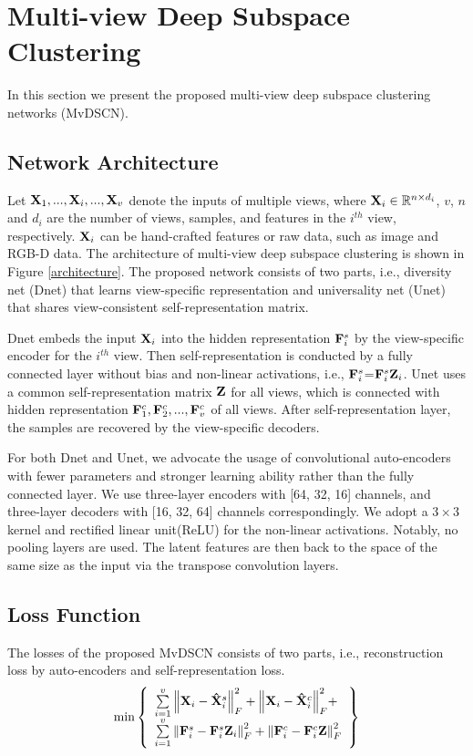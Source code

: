 \documentclass[journal]{IEEEtran}
\begin{document}
\section{Multi-view Deep Subspace Clustering}
\label{s3}

In this section we present the proposed multi-view deep subspace clustering networks (MvDSCN).
\subsection{Network Architecture}
Let ${\bf{X}}_1,..., {\bf{X}}_i,...,{\bf{X}}_v$ denote the inputs of multiple views, where ${\bf{X}}_i \in \mathbb{R}^{n \times d_i}$, $v$, $n$ and $d_i$ are the number of views, samples, and features in the $i^{th}$ view, respectively.
$ {\bf{X}}_i$ can be hand-crafted features or raw data, such as image and RGB-D data.
The architecture of multi-view deep subspace clustering is shown in Figure \ref{architecture}.
The proposed network consists of two parts, i.e., diversity net (Dnet) that learns view-specific representation and universality net (Unet) that shares view-consistent self-representation matrix.

Dnet embeds the input ${\bf{X}}_i$ into the hidden representation ${\bf{F}}^s_i$ by the view-specific encoder for the $i^{th}$ view.
Then self-representation is conducted by a fully connected layer without bias and non-linear activations, i.e., ${\bf{F}}^s_i$=${\bf{F}}^s_i {\bf{Z}}_i$.
Unet uses a common self-representation matrix $\bf{Z}$ for all views, which is connected with hidden representation ${\bf{F}}^c_1, {\bf{F}}^c_2,..., {\bf{F}}^c_v$ of all views.
After self-representation layer, the samples are recovered by the view-specific decoders.

For both Dnet and Unet, we advocate the usage of convolutional auto-encoders with fewer parameters and stronger learning ability rather than the fully connected layer.
We use three-layer encoders with [64, 32, 16] channels, and three-layer decoders with [16, 32, 64] channels correspondingly.
We adopt a $3 \times 3$ kernel and rectified linear unit(ReLU) \cite{Nair2010RectifiedLU} for the non-linear activations.
Notably, no pooling layers are used. The latent features are then back to the space of the same size as the input via the transpose convolution layers.

\subsection{Loss Function}
The losses of the proposed MvDSCN consists of two parts, i.e., reconstruction loss by auto-encoders and self-representation loss.
\begin{equation}\label{loss}
\min \left\{ \begin{array}{l}
 \sum\limits_{i = 1}^v {\left\| {{{\bf{X}}_i} - {\bf{\hat X}}_i^s} \right\|_F^2 + \left\| {{{\bf{X}}_i} - {\bf{\hat X}}_i^c} \right\|_F^2}  +  \\
 \sum\limits_{i = 1}^v {\left\| {{\bf{F}}_i^s - {\bf{F}}_i^s{{\bf{Z}}_i}} \right\|_F^2 + \left\| {{\bf{F}}_i^c - {\bf{F}}_i^c{\bf{Z}}} \right\|_F^2}  \\
 \end{array} \right\}
\end{equation}
\end{document}
